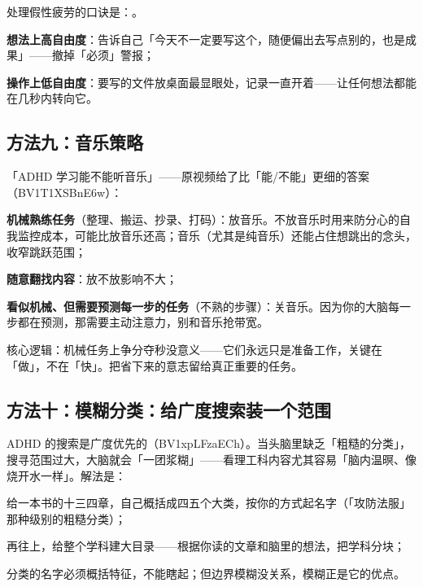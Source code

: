 处理假性疲劳的口诀是：。

\begin{checklist}
  \item \textbf{想法上高自由度}：告诉自己「今天不一定要写这个，随便偏出去写点别的，也是成果」——撤掉「必须」警报；
  \item \textbf{操作上低自由度}：要写的文件放桌面最显眼处，记录一直开着——让任何想法都能在几秒内转向它。
\end{checklist}

\subsection{方法九：音乐策略}

「ADHD 学习能不能听音乐」——原视频给了比「能/不能」更细的答案（BV1T1XSBnE6w）：

\begin{checklist}
  \item \textbf{机械熟练任务}（整理、搬运、抄录、打码）：放音乐。不放音乐时用来防分心的自我监控成本，可能比放音乐还高；音乐（尤其是纯音乐）还能占住想跳出的念头，收窄跳跃范围；
  \item \textbf{随意翻找内容}：放不放影响不大；
  \item \textbf{看似机械、但需要预测每一步的任务}（不熟的步骤）：关音乐。因为你的大脑每一步都在预测，那需要主动注意力，别和音乐抢带宽。
\end{checklist}

核心逻辑：机械任务上争分夺秒没意义——它们永远只是准备工作，关键在「做」，不在「快」。把省下来的意志留给真正重要的任务。

\subsection{方法十：模糊分类：给广度搜索装一个范围}

ADHD 的搜索是广度优先的（BV1xpLFzaECh）。当头脑里缺乏「粗糙的分类」，搜寻范围过大，大脑就会「一团浆糊」——看理工科内容尤其容易「脑内温暝、像烧开水一样」。解法是：

\begin{checklist}
  \item 给一本书的十三四章，自己概括成四五个大类，按你的方式起名字（「攻防法服」那种级别的粗糙分类）；
  \item 再往上，给整个学科建大目录——根据你读的文章和脑里的想法，把学科分块；
  \item 分类的名字必须概括特征，不能瞎起；但边界模糊没关系，模糊正是它的优点。
\end{checklist}


